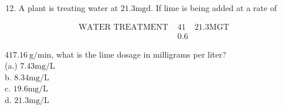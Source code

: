 \documentclass[10pt]{article}
\begin{document}
\begin{enumerate}
  \setcounter{enumi}{11}
  \item A plant is treating water at $21.3 \mathrm{mgd}$. If lime is being added at a rate of
\end{enumerate}

$$
\begin{array}{lll}
\text { WATER TREATMENT } & 41 & 21.3 \mathrm{MGT} \\
& 0.6
\end{array}
$$

$417.16 \mathrm{~g} / \mathrm{min}$, what is the lime dosage in milligrams per liter?\\
(a.) $7.43 \mathrm{mg} / \mathrm{L}$\\
b. $8.34 \mathrm{mg} / \mathrm{L}$\\
c. $19.6 \mathrm{mg} / \mathrm{L}$\\
d. $21.3 \mathrm{mg} / \mathrm{L}$
\end{document}
